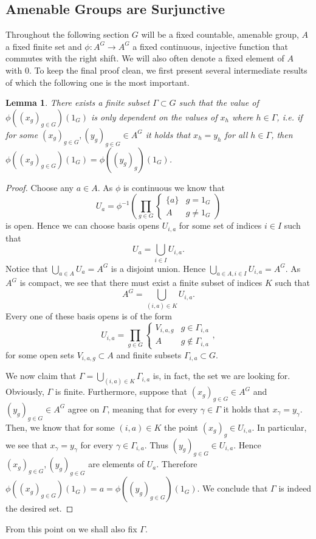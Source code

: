\documentclass[titlepage, a4paper]{article}
\theoremstyle{theoremdd}
\newtheorem{lemma}[theorem]{Lemma}
\theoremstyle{definition}
\theoremstyle{remark}
\begin{document}
\subsection{Amenable Groups are Surjunctive} \label{ssec:amenable_surjunctive}
Throughout the following section $G$ will be a fixed countable, amenable group, $A$ a fixed finite set and $\phi: A^{G} \to A^{G}$ a fixed continuous, injective function that commutes with the right shift. 
We will also often denote a fixed element of $A$ with $0$.
To keep the final proof clean, we first present several intermediate results of which the following one is the most important.
\begin{lemma}
	There exists a finite subset $\Gamma \subset G$ such that the value of $\phi((x_g)_{g \in G})(1_G)$ is only dependent on the values of $x_h$ where  $h \in \Gamma$, 
	i.e. if for some  $(x_g)_{g \in G}, (y_g)_{g \in G} \in A^{G}$ it holds that $x_h = y_h$ for all $h \in \Gamma$, then $\phi((x_g)_{g \in G})(1_G) = \phi((y_g)_g)(1_G)$.
\end{lemma}
\begin{proof}
	Choose any $a \in A$. As $\phi$ is continuous we know that \[
	U_a = \phi^{-1}\left( \prod_{g\in G} \begin{cases}
			\{a\} & g = 1_G\\
			A & g \ne 1_G
	\end{cases} \right)
\]
	is open. Hence we can choose basis opens $U_{i, a}$ for some set of indices $i \in I$ such that  \[
		U_a= \bigcup_{i \in I} U_{i,a}
	.\] 
	Notice that $\bigcup_{a \in A} U_a = A^{G}$ is a disjoint union. 
	Hence $\bigcup_{a \in A, i \in I} U_{i, a} = A^{G}$. 
	As $A^{G}$ is compact, we see that there must exist a finite subset of indices $K$ such that \[
		A^{G} = \bigcup_{(i, a) \in K} U_{i, a}
	.\] 
	Every one of these basis opens is of the form \[
	U_{i,a} = \prod_{g \in G} \begin{cases}
		V_{i,a,g} & g \in \Gamma_{i,a}\\
		A & g \not\in \Gamma_{i,a}
	\end{cases}
	,\]
	for some open sets $V_{i,a,g} \subset A$ and finite subsets $\Gamma_{i,a} \subset G$. 

	We now claim that $\Gamma = \bigcup_{(i,a) \in K} \Gamma_{i,a}$ is, in fact, the set we are looking for. 
	Obviously, $\Gamma$ is finite. 
	Furthermore, suppose that $(x_g)_{g\in G} \in A^{G}$ and $(y_g)_{g \in G} \in A^{G}$ agree on $\Gamma$,
	meaning that for every $\gamma \in \Gamma$ it holds that  $x_\gamma = y_\gamma$.
	Then, we know that for some  $(i, a) \in K$ the point $(x_g)_g \in U_{i,a}$. 
	In particular, we see that $x_\gamma = y_\gamma$ for every $\gamma \in \Gamma_{i,a}$. 
	Thus $(y_g)_{g \in G} \in U_{i, a}$. 
	Hence  $(x_g)_{g \in G} , (y_g)_{g \in G}$ are elements of $U_a$. 
	Therefore  $\phi((x_g)_{g \in G})(1_G) = a = \phi((y_g)_{g \in G})(1_G) $.
	We conclude that $\Gamma$ is indeed the desired set.
\end{proof}
From this point on we shall also fix $\Gamma$. 
\end{document}
